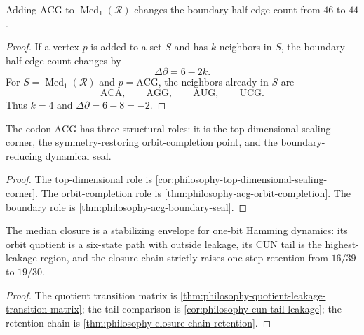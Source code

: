 \begin{theorem}
\label{thm:philosophy-acg-boundary-seal}
Adding $\mathrm{ACG}$ to
$\operatorname{Med}_{1}(\mathcal{R})$ changes the boundary half-edge
count from $46$ to $44$.
\end{theorem}
\begin{proof}
If a vertex $p$ is added to a set $S$ and has $k$ neighbors in $S$, the
boundary half-edge count changes by
$$
  \Delta\partial=6-2k.
$$
For $S=\operatorname{Med}_{1}(\mathcal{R})$ and $p=\mathrm{ACG}$, the
neighbors already in $S$ are
$$
  \mathrm{ACA},\qquad \mathrm{AGG},\qquad
  \mathrm{AUG},\qquad \mathrm{UCG}.
$$
Thus $k=4$ and $\Delta\partial=6-8=-2$.
\end{proof}

\begin{corollary}
\label{cor:philosophy-three-roles-acg}
The codon $\mathrm{ACG}$ has three structural roles: it is the
top-dimensional sealing corner, the symmetry-restoring orbit-completion
point, and the boundary-reducing dynamical seal.
\end{corollary}
\begin{proof}
The top-dimensional role is
\autoref{cor:philosophy-top-dimensional-sealing-corner}. The
orbit-completion role is \autoref{thm:philosophy-acg-orbit-completion}.
The boundary role is \autoref{thm:philosophy-acg-boundary-seal}.
\end{proof}

\begin{theorem}
\label{thm:philosophy-quotient-leakage-dynamics}
The median closure is a stabilizing envelope for one-bit Hamming
dynamics: its orbit quotient is a six-state path with outside leakage,
its CUN tail is the highest-leakage region, and the closure chain
strictly raises one-step retention from $16/39$ to $19/30$.
\end{theorem}
\begin{proof}
The quotient transition matrix is
\autoref{thm:philosophy-quotient-leakage-transition-matrix}; the tail
comparison is \autoref{cor:philosophy-cun-tail-leakage}; the retention
chain is \autoref{thm:philosophy-closure-chain-retention}.
\end{proof}

